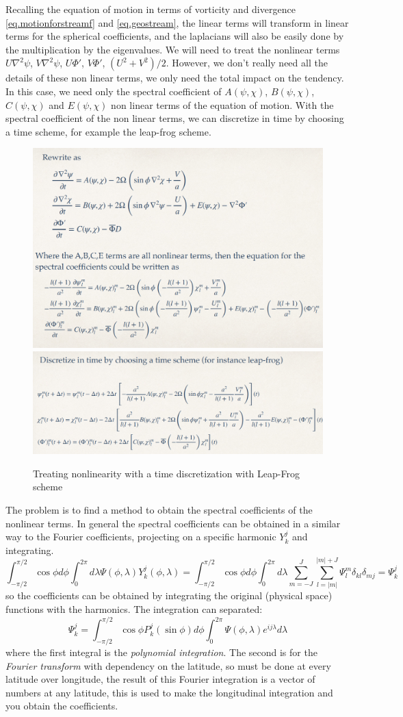 Recalling the equation of motion in terms of vorticity and divergence \ref{eq.motionforstreamf} and \ref{eq.geostream}, the linear terms will transform in linear terms for the spherical coefficients, and the laplacians will also be easily done by the multiplication by the eigenvalues. We will need to treat the nonlinear terms $U\nabla^2\psi$, $V\nabla^2\psi$, $U\Phi'$, $V\Phi'$, $(U^2+V^2)/2$.  However, we don't really need all the details of these non linear terms, we only need the total impact on the tendency. In this case, we need only the spectral coefficient of $A(\psi,\chi)$, $B(\psi,\chi)$, $C(\psi,\chi)$ and $E(\psi,\chi)$ non linear terms of the equation of motion. With the spectral coefficient of the non linear terms, we can discretize in time by choosing a time scheme, for example the leap-frog scheme.
\begin{figure}[htpb]
    \centering
    \includegraphics[width=0.5\linewidth]{uploads/Screenshot 2024-11-18 095232.png}\quad\includegraphics[width=0.5\linewidth]{uploads/Screenshot 2024-11-18 095428.png}
    \caption{Treating nonlinearity with a time discretization with Leap-Frog scheme}
    \label{fig:trating nonlinearity}
\end{figure}

The problem is to find a method to obtain the spectral coefficients of the nonlinear terms. In general the spectral coefficients can be obtained in a similar way to the
Fourier coefficients, projecting on a specific harmonic $Y_k^j$ and integrating.
\[\int_{-\pi/2}^{\pi/2}\cos\phi d\phi\int_0^{2\pi}d\lambda\Psi(\phi,\lambda) Y_k^j(\phi,\lambda)=\int_{-\pi/2}^{\pi/2}\cos\phi d\phi\int_0^{2\pi}d\lambda\displaystyle\sum_{m=-J}^J\displaystyle\sum_{l=|m|}^{|m|+J}\Psi_l^m\delta_{kl}\delta_{mj}=\Psi_k^j\]
so the coefficients can be obtained by integrating the original (physical space) functions with the harmonics. The integration can separated: 
\begin{equation}
    \Psi_k^j=\int_{-\pi/2}^{\pi/2}\cos\phi P_k^j(\sin\phi)d\phi\int_0^{2\pi}\Psi(\phi, \lambda)e^{ij\lambda}d\lambda
\end{equation}
where the first integral is the \textit{polynomial integration}. The second is for the \textit{Fourier transform} with dependency on the latitude, so must be done at every latitude over longitude, the result of this Fourier integration is a vector of numbers at any latitude, this is used to make the longitudinal integration and you obtain the coefficients.

